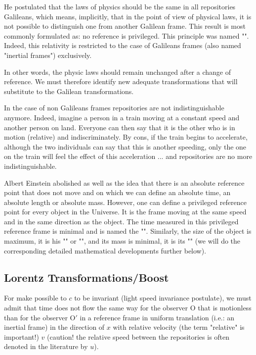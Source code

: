 	He postulated that the laws of physics should be the same in all repositories Galileans, which means, implicitly, that in the point of view of physical laws, it is not possible to distinguish one from another Galilean frame. This result is most commonly formulated as: no reference is privileged. This principle was named "". Indeed, this relativity is restricted to the case of Galileans frames (also named "inertial frames") exclusively.
	
	In other words, the physic laws should remain unchanged after a change of reference. We must therefore identify new adequate transformations that will substitute to the Galilean transformations.
	
	In the case of non Galileans frames repositories are not indistinguishable anymore. Indeed, imagine a person in a train moving at a constant speed and another person on land. Everyone can then say that it is the other who is in motion (relative) and indiscriminately. By cons, if the train begins to accelerate, although the two individuals can say that this is another speeding, only the one on the train will feel the effect of this acceleration ... and repositories are no more indistinguishable.
	
	Albert Einstein abolished as well as the idea that there is an absolute reference point that does not move and on which we can define an absolute time, an absolute length or absolute mass. However, one can define a privileged reference point for every object in the Universe. It is the frame moving at the same speed and in the same direction as the object. The time measured in this privileged reference frame is minimal and is named the "". Similarly, the size of the object is maximum, it is his "" or "", and its mass is minimal, it is its "" (we will do the corresponding detailed mathematical developments further below).
	
		\subsection{Lorentz Transformations/Boost}\label{lorentz transformations}
		For make possible to $c$ to be invariant (light speed invariance postulate), we must admit that time does not flow the same way for the observer $\text{O}$ that is motionless than for the observer $\text{O}'$ in a reference frame in uniform translation (i.e.: an inertial frame) in the direction of $x$  with relative velocity (the term "relative" is important!) $v$ (caution! the relative speed between the repositories is often denoted in the literature by $u$).

